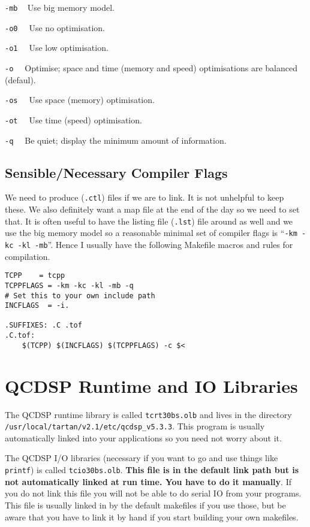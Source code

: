 \begin{description}
\item{{\tt -mb} \ } Use big memory model.
\item{\tt -o0 \ } Use no optimisation.
\item{\tt -o1 \ } Use low optimisation.
\item{\tt -o \ } Optimise; space and time (memory and speed) optimisations
are balanced (defaul).
\item{\tt -os \ } Use space (memory) optimisation.
\item{\tt -ot \ } Use time (speed) optimisation.
\item{\tt -q \ } Be quiet; display the minimum amount of information.
\end{description}

\subsection{Sensible/Necessary Compiler Flags}
We need to produce ({\tt .ctl}) files if we are to link. It is not unhelpful
to keep these. We also definitely want a map file at the end of the day so 
we need to set that. It is often useful to have the listing file ({\tt .lst})
file around as well and we use the big memory model so a reasonable minimal
set of compiler flags is ``{\tt -km -kc -kl -mb}''. 
Hence I usually have the following Makefile macros and rules for compilation.
\begin{verbatim}
TCPP 	= tcpp
TCPPFLAGS = -km -kc -kl -mb -q
# Set this to your own include path 
INCFLAGS  = -i.

.SUFFIXES: .C .tof
.C.tof:
	$(TCPP) $(INCFLAGS) $(TCPPFLAGS) -c $<
\end{verbatim}

\section{QCDSP Runtime and IO Libraries}
The QCDSP runtime library is called {\tt tcrt30bs.olb} and lives in the 
directory {\tt/usr/local/tartan/v2.1/etc/qcdsp\_v5.3.3}. This program is usually automatically linked into your applications so you need not worry about it.

The QCDSP I/O libraries (necessary if you want to go and use things like {\tt printf}) is called {\tt tcio30bs.olb}. {\bf This file is in the default link path
but is not automatically linked at run time. You have to do it manually}. If you
do not link this file you will not be able to do serial IO from your programs.
This file is usually linked in by the default makefiles if you use those, but
be aware that you have to link it by hand if you start building your
own makefiles.

